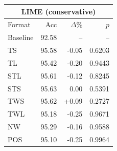 \begin{tabular}{lrrr}
\toprule
\multicolumn{4}{c}{\textbf{LIME (conservative)}} \\
\midrule
Format & Acc & $\Delta$\% & $p$ \\
\midrule
Baseline & 92.58 & -- & -- \\
\midrule
TS & 95.58 & -0.05 & 0.6203 \\
TL & 95.42 & -0.20 & 0.9443 \\
STL & 95.61 & -0.12 & 0.8245 \\
STS & 95.63 & 0.00 & 0.5391 \\
TWS & 95.62 & +0.09 & 0.2727 \\
TWL & 95.18 & -0.25 & 0.9671 \\
NW & 95.29 & -0.16 & 0.9588 \\
POS & 95.10 & -0.25 & 0.9964 \\
\bottomrule
\end{tabular}